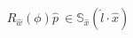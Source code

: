 \documentclass[preview]{standalone}
\begin{document}
\begin{align*}
R_{\hat w}(\phi) \hat p \
                           \in \mathbb{S}_{\hat x}(\hat l \cdot \hat x)
\end{align*}
\end{document}
